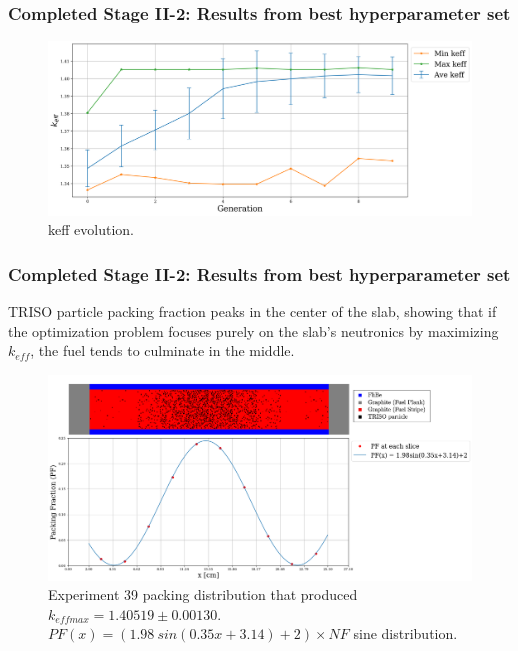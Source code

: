 \begin{frame}
    \frametitle{Completed Stage II-2: Results from best hyperparameter set}
    \begin{figure}[]
        \centering
        \includegraphics[width=\linewidth]{../docs/figures/keff_conv_39.png}
        \caption{keff evolution.}
    \end{figure}
\end{frame}

\begin{frame}
    \frametitle{Completed Stage II-2: Results from best hyperparameter set}
    TRISO particle packing fraction peaks in the center 
    of the slab, showing that if the optimization problem focuses purely on the 
    slab's neutronics by maximizing $k_{eff}$, the fuel tends to culminate in the 
    middle. 

    \begin{figure}[]
        \centering
        \includegraphics[width=0.8\linewidth]{../docs/figures/triso_distribution_sine_39.png} 
        \caption{Experiment 39 packing distribution that produced 
        $k_{eff max} = 1.40519 \pm 0.00130$. 
        $PF(x) = (1.98\ sin(0.35x+3.14)+2)  \times NF$ sine distribution. }
        \label{fig:triso_distribution_sine_39}
    \end{figure}
\end{frame}